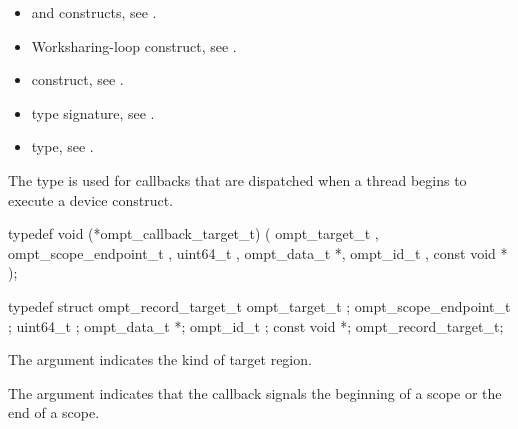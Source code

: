 \crossreferences
\begin{itemize}
\item {} and  constructs, 
see .

\item Worksharing-loop construct, see .

\item {} construct, see .

\item {} type signature, see   .

\item {} type, see .
\end{itemize}



\label{sec:ompt_callback_target_t}

\summary
The  type is used for callbacks that are
dispatched when a thread begins to execute a device construct.

\format
\begin{ccppspecific}
\begin{omptCallback}
typedef void (*ompt_callback_target_t) (
  ompt_target_t ,
  ompt_scope_endpoint_t ,
  uint64_t ,
  ompt_data_t *,
  ompt_id_t ,
  const void *
);
\end{omptCallback}
\end{ccppspecific}

\record
\begin{ccppspecific}
\begin{omptRecord}
typedef struct ompt_record_target_t {
  ompt_target_t ;
  ompt_scope_endpoint_t ;
  uint64_t ;
  ompt_data_t *;
  ompt_id_t ;
  const void *;
} ompt_record_target_t;
\end{omptRecord}
\end{ccppspecific}


\argdesc
The  argument indicates the kind of target region.

The  argument indicates that the callback signals 
the beginning of a scope or the end of a scope.

